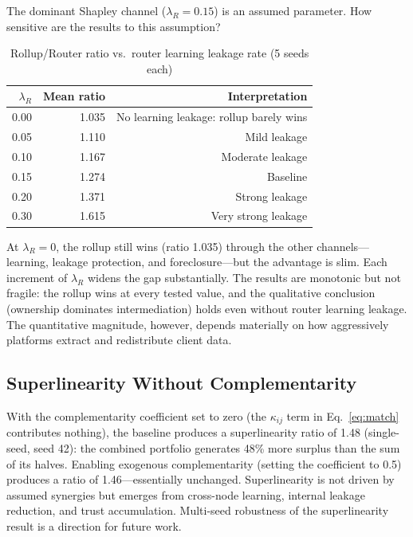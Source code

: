 \documentclass[12pt]{article}
\theoremstyle{definition}
\begin{document}
The dominant Shapley channel ($\lambda_R = 0.15$) is an assumed parameter. How sensitive are the results to this assumption?

\begin{table}[H]
\centering
\caption{Rollup/Router ratio vs.\ router learning leakage rate (5 seeds each)}
\label{tab:lr_sensitivity}
\begin{tabular}{rrr}
\toprule
$\lambda_R$ & Mean ratio & Interpretation \\
\midrule
0.00 & 1.035 & No learning leakage: rollup barely wins \\
0.05 & 1.110 & Mild leakage \\
0.10 & 1.167 & Moderate leakage \\
0.15 & 1.274 & Baseline \\
0.20 & 1.371 & Strong leakage \\
0.30 & 1.615 & Very strong leakage \\
\bottomrule
\end{tabular}
\end{table}

\noindent At $\lambda_R = 0$, the rollup still wins (ratio 1.035) through the other channels---learning, leakage protection, and foreclosure---but the advantage is slim. Each increment of $\lambda_R$ widens the gap substantially. The results are monotonic but not fragile: the rollup wins at every tested value, and the qualitative conclusion (ownership dominates intermediation) holds even without router learning leakage. The quantitative magnitude, however, depends materially on how aggressively platforms extract and redistribute client data.

\subsection{Superlinearity Without Complementarity}
\label{sec:superlinearity}

With the complementarity coefficient set to zero (the $\kappa_{ij}$ term in Eq.~\ref{eq:match} contributes nothing), the baseline produces a superlinearity ratio of 1.48 (single-seed, seed 42): the combined portfolio generates 48\% more surplus than the sum of its halves. Enabling exogenous complementarity (setting the coefficient to 0.5) produces a ratio of 1.46---essentially unchanged. Superlinearity is not driven by assumed synergies but emerges from cross-node learning, internal leakage reduction, and trust accumulation. Multi-seed robustness of the superlinearity result is a direction for future work.
\end{document}
